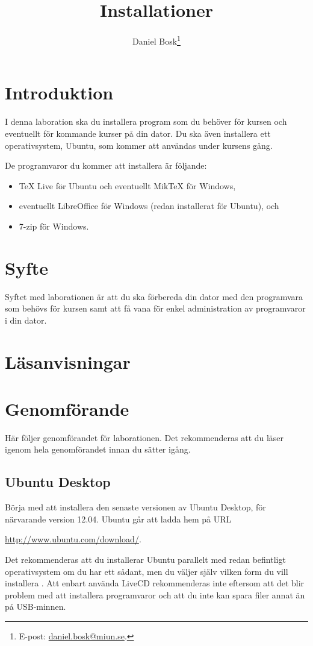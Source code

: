 \documentclass[11pt,a4paper]{miunasgn}
\title{Installationer}
\author{Daniel Bosk\footnote{%
	E-post: \href{mailto:daniel.bosk@miun.se}{daniel.bosk@miun.se}.
}}
\date{\svnId}
\begin{document}
\maketitle
\thispagestyle{foot}
\tableofcontents


\section{Introduktion}
\label{sec:Introduktion}
\noindent
I denna laboration ska du installera program som du behöver för kursen och 
eventuellt för kommande kurser på din dator.
Du ska även installera ett operativsystem, Ubuntu, som kommer att användas 
under kursens gång.

De programvaror du kommer att installera är följande:
\begin{itemize}
	\item TeX Live för Ubuntu och eventuellt MikTeX för Windows,
	\item eventuellt LibreOffice för Windows (redan installerat för Ubuntu), och
	\item 7-zip för Windows.
\end{itemize}


\section{Syfte}
\label{sec:Syfte}
\noindent
Syftet med laborationen är att du ska förbereda din dator med den programvara 
som behövs för kursen samt att få vana för enkel administration av programvaror 
i din dator.


\section{Läsanvisningar}
\label{sec:Lasanvisningar}
\noindent



\section{Genomförande}
\label{sec:Genomforande}
\noindent
Här följer genomförandet för laborationen.
Det rekommenderas att du läser igenom hela genomförandet innan du sätter igång.

\subsection{Ubuntu Desktop}
\noindent
Börja med att installera den senaste versionen av Ubuntu Desktop, för 
närvarande version 12.04.
Ubuntu går att ladda hem på URL
\begin{center}
	\url{http://www.ubuntu.com/download/}.
\end{center}
Det rekommenderas att du installerar Ubuntu parallelt med redan befintligt 
operativsystem om du har ett sådant, men du väljer själv vilken form du vill 
installera \citep[för detaljer, se][]{UbuntuInstall}.
Att enbart använda LiveCD rekommenderas inte eftersom att det blir problem med 
att installera programvaror och att du inte kan spara filer annat än på 
USB-minnen.
\end{document}
